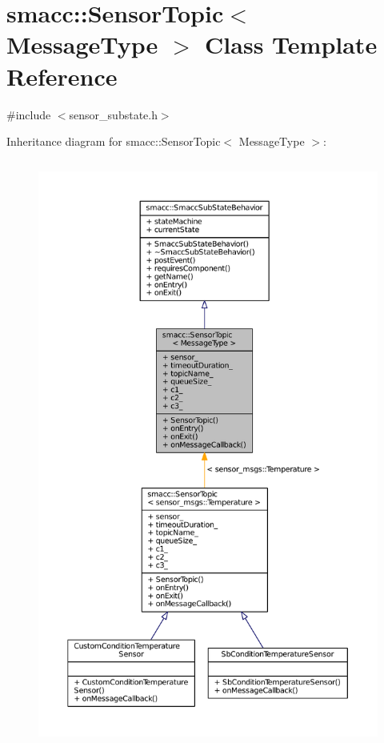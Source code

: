 \hypertarget{classsmacc_1_1SensorTopic}{}\section{smacc\+:\+:Sensor\+Topic$<$ Message\+Type $>$ Class Template Reference}
\label{classsmacc_1_1SensorTopic}


{\ttfamily \#include $<$sensor\+\_\+substate.\+h$>$}



Inheritance diagram for smacc\+:\+:Sensor\+Topic$<$ Message\+Type $>$\+:
\nopagebreak
\begin{figure}[H]
\begin{center}
\leavevmode
\includegraphics[height=550pt]{classsmacc_1_1SensorTopic__inherit__graph}
\end{center}
\end{figure}


